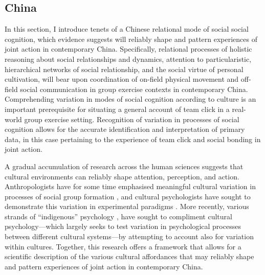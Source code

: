 \begin{CJK}{UTF8}{gbsn}







\subsection{China}
In this section, I introduce tenets of a Chinese relational mode of social social cognition, which evidence suggests will reliably shape and pattern experiences of joint action in contemporary China.  Specifically, relational processes of holistic reasoning about social relationships and dynamics, attention to particularistic, hierarchical networks of social relationship, and the social virtue of personal cultivation, will bear upon coordination of on-field physical movement and off-field social communication in group exercise contexts in contemporary China. Comprehending variation in modes of social cognition according to culture is an important prerequisite for situating a general account of team click in a real-world group exercise setting.  Recognition of variation in processes of social cognition allows for the accurate identification and interpretation of primary data, in this case pertaining to the experience of team click and social bonding in joint action.

A gradual accumulation of research across the human sciences suggests that cultural environments can reliably shape attention, perception, and action.  Anthropologists have for some time emphasised meaningful cultural variation in processes of social group formation \citep{Strodtbeck1961,Kluckhohn1961,Mead1967,Fei1992}, and cultural psychologists have sought to demonstrate this variation in experimental paradigms \citep{Markus1991,Nisbett2001}.  More recently, various strands of ``indigenous'' psychology \citep[e.g., Chinese indigenous psychology, see ][]{Liu2009}, have sought to compliment cultural psychology---which largely seeks to test variation in psychological processes between different cultural systems---by attempting to account also for variation within cultures.  Together, this research offers a framework that allows for a scientific description of the various cultural affordances that may reliably shape and pattern experiences of joint action in contemporary China.


\end{CJK}

